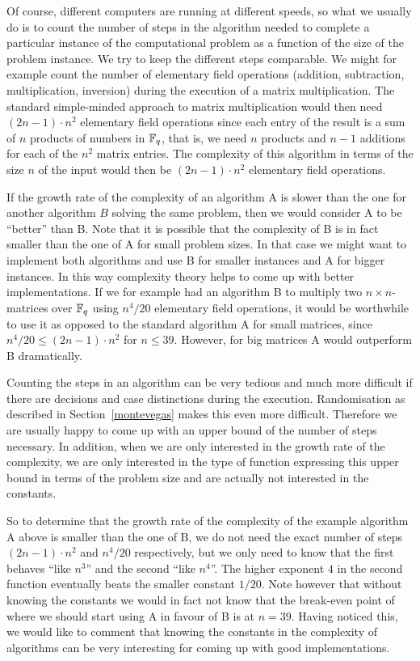 Of course, different computers are running at different speeds, so
what we usually do is to count the number of steps in the algorithm
needed to complete a particular instance of the computational problem
as a function of the size of the problem instance.
We try to keep the different steps comparable. We might for example
count the number of elementary field operations (addition,
%
subtraction, multiplication, inversion) during the execution of a
matrix multiplication. The standard simple-minded approach to matrix
multiplication would then need $(2n-1)\cdot n^2$ elementary field
operations since each entry of the result is a sum of $n$ products of
numbers in $\mathbb{F}_q$, that is, we need $n$ products and $n-1$ additions
for each of the $n^2$ matrix entries. The complexity of this algorithm
in terms of the size $n$ of the input would then be $(2n-1)\cdot n^2$
elementary field operations.

If the growth rate of the complexity of an algorithm A is slower
%
than the one for another algorithm $B$ solving the same problem, then 
we would consider A to be ``better'' than B. Note that it is
possible that the complexity of B is in fact smaller than
the one of A for small problem sizes. In that case we might want to
implement both algorithms and use B for smaller instances and A for
bigger instances. In this way complexity theory helps to come up with
better implementations. If we for example had an algorithm B to multiply
two $n\times n$-matrices over $\mathbb{F}_q$ using $n^4/20$ elementary field
operations, it would be worthwhile to use it as opposed to the
standard algorithm A for small matrices, since
$n^4/20 \le (2n-1)\cdot n^2$ for $n \le 39$. However, for big
matrices A would outperform B dramatically.

Counting the steps in an algorithm can be very tedious and much more
difficult if there are decisions and case distinctions during the
execution. Randomisation as described in Section~\ref{montevegas}
makes this even more difficult. Therefore we are usually happy to come
up with an upper bound of the number of steps necessary. In addition,
when we are only interested in the growth rate of the complexity, we
%
are only interested in the type of function expressing this upper
bound in terms of the problem size and are actually not interested in
the constants. 

So to determine that the growth rate of the complexity
%
of the example algorithm A above is smaller than the one of B, we do
not need the exact number of steps $(2n-1)\cdot n^2$ and $n^4/20$
respectively, but we only need to know that the first behaves ``like
$n^3$'' and the second ``like $n^4$''. The higher exponent $4$ in the
second function eventually beats the smaller constant $1/20$.
Note however that without knowing the constants we would in fact not
know that the break-even point of where we should start using A in
favour of B is at $n=39$. Having noticed this, we would like to comment
that knowing the constants in the complexity of algorithms can be very
interesting for coming up with good implementations.

